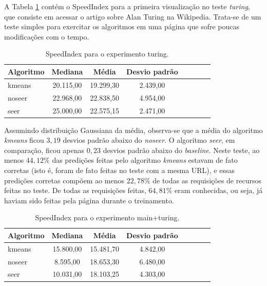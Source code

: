 \documentclass[10pt,twocolumn,letterpaper]{article}
\begin{document}
A Tabela \ref{tbl-turing} contém o SpeedIndex para a primeira visualização no teste \emph{turing}, que consiste em acessar o artigo sobre Alan Turing na Wikipedia. Trata-se de um teste simples para exercitar os algoritmos em uma página que sofre poucas modificações com o tempo.

\begin{table}
\begin{center}
\begin{tabular}{l*{6}{c}r}
\hline
Algoritmo & Mediana & Média & Desvio padrão \\
\hline
kmeans & 20.115,00 & 19.299,30  & 2.439,00 \\
noseer & 22.968,00 & 22.838,50 & 4.954,00 \\
seer & 25.000,00 & 22.575,15 & 2.471,00 \\
\hline
\end{tabular}
\end{center}
\caption{SpeedIndex para o experimento turing.}
\label{tbl-turing}
\end{table}

Assumindo distribuição Gaussiana da média, observa-se que a média do algoritmo \emph{kmeans} ficou $3,19$ desvios padrão abaixo do \emph{noseer}. O algoritmo \emph{seer}, em comparação, ficou apenas $0,23$ desvios padrão abaixo do \emph{baseline}. Neste teste, ao menos $44,12 \%$ das predições feitas pelo algoritmo \emph{kmeans} estavam de fato corretas (isto é, foram de fato feitas no teste com a mesma URL), e essas predições corretas compõem ao menos $22,78 \%$ de todas as requisições de recursos feitas no teste. De todas as requisições feitas, $64,81 \%$ eram conhecidas, ou seja, já haviam sido feitas pela página durante o treinamento.

\begin{table}
\begin{center}
\begin{tabular}{l*{6}{c}r}
\hline
Algoritmo & Mediana & Média & Desvio padrão \\
\hline
kmeans & 15.800,00 & 15.481,70 & 4.842,00 \\
noseer & 8.595,00 & 18.653,30 & 6.480,00 \\
seer & 10.031,00 & 18.103,25 & 4.303,00 \\
\hline
\end{tabular}
\end{center}
\caption{SpeedIndex para o experimento main+turing.}
\label{tbl-main-turing}
\end{table}
\end{document}
